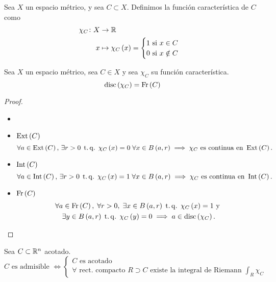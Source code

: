 \begin{defi}
    Sea $X$ un espacio métrico, y sea $C\subset X$. Definimos la función característica de $C$ como
    \[
        \begin{aligned}
            \chi_C \colon X &\to \mathbb{R} \\
            x &\mapsto \chi_C \left( x \right) =
            \begin{cases}
                1 \text{ si } x \in C \\
                0 \text{ si } x \notin C
            \end{cases}
        \end{aligned}
    \]
\end{defi}

\begin{lema}
    Sea $X$ un espacio métrico, sea $C \in X$ y sea $\chi_C$ su función característica.
    \[
        \operatorname{disc} \left( \chi_C \right) = \operatorname{Fr} \left( C \right)
    \]
\end{lema}
\begin{proof}
    \begin{itemize} \item[]
        \item $\operatorname{Ext} \left( C \right)$
            \[
                \forall a \in \operatorname{Ext} \left( C \right), \, \exists r > 0 \operatorname{\;t.q.\;} \chi_C \left( x \right) = 0 \; \forall x \in B \left( a, r \right) \implies \chi_C \text{ es continua en } \operatorname{Ext} \left( C \right) .
            \]
        \item $\operatorname{Int} \left( C \right)$
            \[
                \forall a \in \operatorname{Int} \left( C \right), \, \exists r > 0 \operatorname{\;t.q.\;} \chi_C \left( x \right) = 1 \; \forall x \in B \left( a, r \right) \implies \chi_C \text{ es continua en } \operatorname{Int} \left( C \right) .
            \]
        \item $\operatorname{Fr} \left( C \right)$
            \begin{gather*}
                \forall a \in \operatorname{Fr} \left( C \right) , \; \forall r > 0, \; \exists x \in B \left( a, r \right) \operatorname{\;t.q.\;} \chi_C \left( x \right) = 1 \text{ y } \\ \exists y \in B \left( a, r \right) \operatorname{\;t.q.\;} \chi_C \left( y \right) = 0 \implies a \in \operatorname{disc} \left( \chi_C \right).
            \end{gather*}
    \end{itemize}
\end{proof}

\begin{col}
    Sea $C \subset \mathbb{R}^n$ acotado.
    \[
        C \text{ es admisible } \iff \begin{cases} C \text{ es acotado } \\ \forall \text{ rect. compacto } R \supset C \text{ existe la integral de Riemann } \int_R \chi_C \end{cases}
    \]
\end{col}

